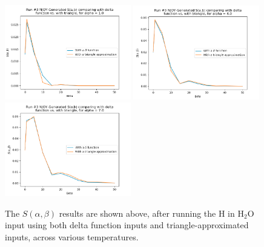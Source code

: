 \documentclass[a4paper]{article}
\begin{document}

\begin{figure}[H]
\centering
\includegraphics[width=0.49\textwidth]{run3_sab_alpha_equals_1.png}
\includegraphics[width=0.49\textwidth]{run3_sab_alpha_equals_4.png}
\includegraphics[width=0.49\textwidth]{run3_sab_alpha_equals_7.png}
\caption{\label{fig:run3_sab} The $S(\alpha,\beta)$ results are shown above, after running the H in H$_2$O input using both delta function inputs and triangle-approximated inputs, across various temperatures.}
\end{figure}



\newpage
\end{document}
